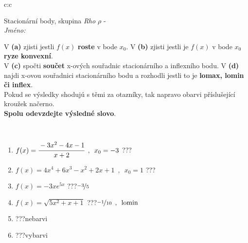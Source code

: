 \documentclass[10pt]{report}
\begin{document}
\newpage
\thispagestyle{empty}
\begin{tabular}{c:c}
\begin{minipage}[c][104.5mm][t]{0.5\linewidth}
\begin{center}
\vspace{7mm}
{\huge Stacionární body, skupina \textit{Rho $\rho$} -}\\[5mm]
\textit{Jméno:}\phantom{xxxxxxxxxxxxxxxxxxxxxxxxxxxxxxxxxxxxxxxxxxxxxxxxxxxxxxxxxxxxxxxxx}\\[5mm]
\begin{minipage}{0.95\linewidth}
\begin{center}
{\small V \textbf{(a)} zjisti jestli $f(x)$ \textbf{roste} v bode $x_0$. V \textbf{(b)} zjisti jestli je $f(x)$ v bode $x_0$ \textbf{ryze konvexní}.\\V \textbf{(c)} spočti \textbf{součet} x-ových souřadnic stacionárního a inflexního bodu. V \textbf{(d)} najdi x-ovou souřadnici stacionárního bodu a rozhodli jestli to je \textbf{lomax, lomin či inflex}.\\Pokud se výsledky shodujú s těmi za otazníky, tak napravo obarvi příslušející kroužek načerno.\\\textbf{Spolu odevzdejte výsledné slovo}}.
\end{center}
\end{minipage}
\\[1mm]
\begin{minipage}{0.79\linewidth}
\begin{center}
\begin{varwidth}{\linewidth}
\begin{enumerate}
\normalsize
\item $f(x)=\cfrac{-3x^2-4x-1}{x+2}\enspace , \enspace x_0=-3$\quad \dotfill\; ???\;\dotfill \quad {}
\item $f(x)=4x^4+6x^3-x^2+2x+1\enspace , \enspace x_0=1$\quad \dotfill\; ???\;\dotfill \quad {}
\item $f(x)=-3xe^{5x}$\quad \dotfill\; ???\;\dotfill \quad $\nicefrac{-3}{5}$
\item $f(x)=\sqrt{5x^2+x+1}$\quad \dotfill\; ???\;\dotfill \quad $\nicefrac{-1}{10}\enspace , \enspace \mathrm{lomin}$
\item \quad \dotfill\; ???\;\dotfill \quad nebarvi
\item \quad \dotfill\; ???\;\dotfill \quad vybarvi
\end{enumerate}
\end{varwidth}
\end{center}

\end{minipage}
\end{center}
\end{minipage}
\end{tabular}
\end{document}
